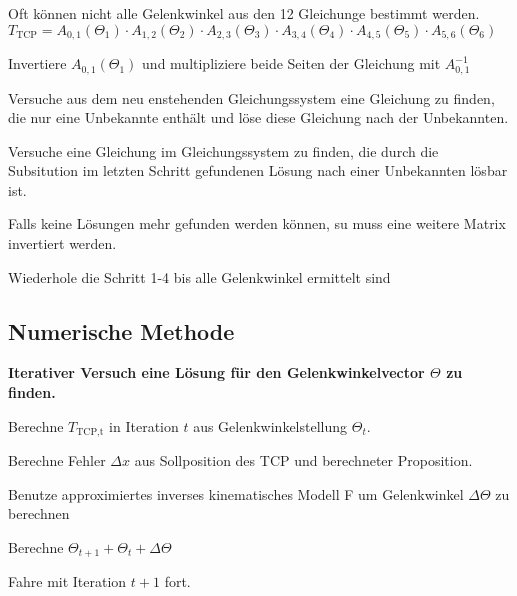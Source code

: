 Oft können nicht alle Gelenkwinkel aus den 12 Gleichunge bestimmt werden.
$T_{\text{TCP}} = A_{0,1}(\Theta_1) \cdot A_{1,2}(\Theta_2) \cdot A_{2,3}(\Theta_3)
 \cdot A_{3,4}(\Theta_4) \cdot A_{4,5}(\Theta_5) \cdot A_{5,6}(\Theta_6)$

 \begin{compactitem}
     \item Invertiere $A_{0,1}(\Theta_1)$ und multipliziere beide Seiten der Gleichung mit $A^{-1}_{0,1}$
     \item Versuche aus dem neu enstehenden Gleichungssystem eine Gleichung zu finden, die nur eine
     Unbekannte enthält und löse diese Gleichung nach der Unbekannten.
     \item Versuche eine Gleichung im Gleichungssystem zu finden, die durch die Subsitution im letzten
     Schritt gefundenen Lösung nach einer Unbekannten lösbar ist.
     \item Falls keine Lösungen mehr gefunden werden können, su muss eine weitere Matrix invertiert werden.
     \item Wiederhole die Schritt 1-4 bis alle Gelenkwinkel ermittelt sind
 \end{compactitem}

\subsection{Numerische Methode}
\textbf{Iterativer Versuch eine Lösung für den Gelenkwinkelvector $\Theta$ zu finden.}
\begin{compactitem}
     \item Berechne $T_{\text{TCP,t}}$ in Iteration $t$ aus Gelenkwinkelstellung $\Theta_t$.
     \item Berechne Fehler $\Delta x$ aus Sollposition des TCP und berechneter Proposition.
     \item Benutze approximiertes inverses kinematisches Modell F um Gelenkwinkel $\Delta \Theta$
     zu berechnen
     \item Berechne $\Theta_{t+1} + \Theta_t + \Delta\Theta$
     \item Fahre mit Iteration $t+1$ fort.
 \end{compactitem}

